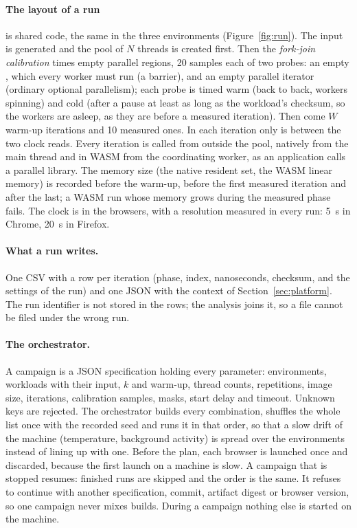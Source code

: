 \paragraph{The layout of a run} is shared code, the same in the three
environments (Figure~\ref{fig:run}). The input is generated and the pool of
$N$ threads is created first. Then the \emph{fork-join calibration} times
empty parallel regions, 20 samples each of two probes: an empty
, which every worker must run (a barrier), and an empty
parallel iterator (ordinary optional parallelism); each probe is timed warm
(back to back, workers spinning) and cold (after a pause at least as long
as the workload's checksum, so the workers are asleep, as they are before a
measured iteration). Then come $W$ warm-up iterations and 10 measured
ones. In each iteration only  is between the two clock reads.
Every iteration is called from outside the pool, natively from the main
thread and in WASM from the coordinating worker, as an application calls a
parallel library. The memory size (the native resident set, the WASM linear
memory) is recorded before the warm-up, before the first measured iteration
and after the last; a WASM run whose memory grows during the measured phase
fails. The clock is  in the browsers, with a
resolution measured in every run: 5~\textmu s in Chrome, 20~\textmu s in
Firefox.

\paragraph{What a run writes.} One CSV with a row per iteration (phase,
index, nanoseconds, checksum, and the settings of the run) and one JSON
with the context of Section~\ref{sec:platform}. The run identifier is not
stored in the rows; the analysis joins it, so a file cannot be filed under
the wrong run.

\paragraph{The orchestrator.} A campaign is a JSON specification holding
every parameter: environments, workloads with their input, $k$ and warm-up,
thread counts, repetitions, image size, iterations, calibration samples,
masks, start delay and timeout. Unknown keys are rejected. The orchestrator
builds every combination, shuffles the whole list once with the recorded
seed and runs it in that order, so that a slow drift of the machine
(temperature, background activity) is spread over the environments instead
of lining up with one. Before the plan, each browser is launched once and
discarded, because the first launch on a machine is slow. A campaign that
is stopped resumes: finished runs are skipped and the order is the same. It
refuses to continue with another specification, commit, artifact digest or
browser version, so one campaign never mixes builds. During a campaign
nothing else is started on the machine.

